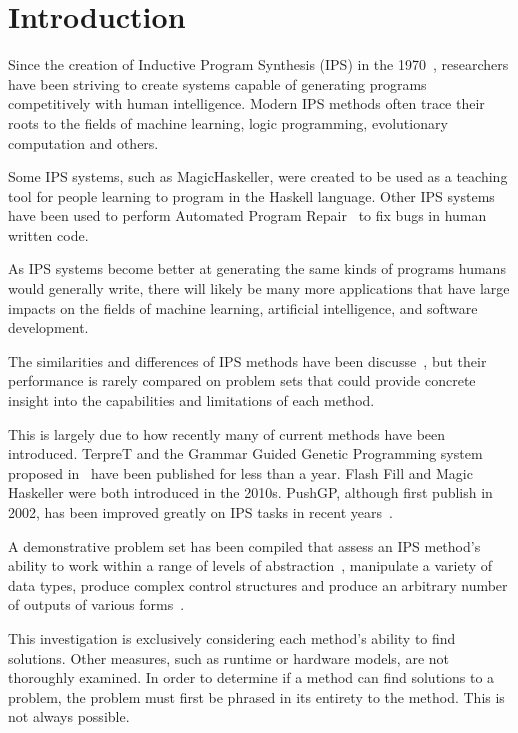 \section{Introduction}

Since the creation of Inductive Program Synthesis (IPS) in the 1970~\cite{Kitzelmann2009}, researchers have been striving to create systems capable of generating programs competitively with human intelligence. Modern IPS methods often trace their roots to the fields of machine learning, logic programming, evolutionary computation and others.

Some IPS systems, such as MagicHaskeller, were created to be used as a teaching tool for people learning to program in the Haskell language. Other IPS systems have been used to perform Automated Program Repair~\cite{Perelman2014} to fix bugs in human written code.

As IPS systems become better at generating the same kinds of programs humans would generally write, there will likely be many more applications that have large impacts on the fields of machine learning, artificial intelligence, and software development.

The similarities and differences of IPS methods have been discusse~\cite{Kitzelmann2009}, but their performance is rarely compared on problem sets that could provide concrete insight into the capabilities and limitations of each method.

This is largely due to how recently many of current methods have been introduced. TerpreT and the Grammar Guided Genetic Programming system proposed in~\cite{Forstenlechner:2017:eurogp} have been published for less than a year. Flash Fill and Magic Haskeller were both introduced in the 2010s. PushGP, although first publish in 2002, has been improved greatly on IPS tasks in recent years~\cite{Helmuth2015a}.

A demonstrative problem set has been compiled that assess an IPS method's ability to work within a range of levels of abstraction~\cite{Gaunt2016}, manipulate a variety of data types, produce complex control structures and produce an arbitrary number of outputs of various forms~\cite{Helmuth2015b}.

This investigation is exclusively considering each method's ability to find solutions. Other measures, such as runtime or hardware models, are not thoroughly examined. In order to determine if a method can find solutions to a problem, the problem must first be phrased in its entirety to the method. This is not always possible.

